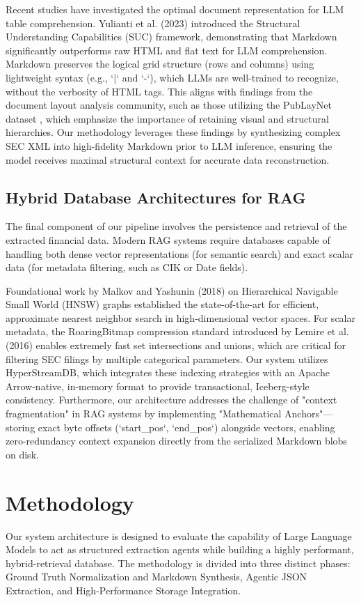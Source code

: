 \documentclass[journal, onecolumn]{IEEEtran}
\begin{document}
Recent studies have investigated the optimal document representation for LLM table comprehension. Yulianti et al. (2023) \cite{yulianti2023structural} introduced the Structural Understanding Capabilities (SUC) framework, demonstrating that Markdown significantly outperforms raw HTML and flat text for LLM comprehension. Markdown preserves the logical grid structure (rows and columns) using lightweight syntax (e.g., `|` and `-`), which LLMs are well-trained to recognize, without the verbosity of HTML tags. This aligns with findings from the document layout analysis community, such as those utilizing the PubLayNet dataset \cite{zhong2020publaynet}, which emphasize the importance of retaining visual and structural hierarchies. Our methodology leverages these findings by synthesizing complex SEC XML into high-fidelity Markdown prior to LLM inference, ensuring the model receives maximal structural context for accurate data reconstruction.

\subsection{Hybrid Database Architectures for RAG}
The final component of our pipeline involves the persistence and retrieval of the extracted financial data. Modern RAG systems require databases capable of handling both dense vector representations (for semantic search) and exact scalar data (for metadata filtering, such as CIK or Date fields). 

Foundational work by Malkov and Yashunin (2018) \cite{malkov2018hnsw} on Hierarchical Navigable Small World (HNSW) graphs established the state-of-the-art for efficient, approximate nearest neighbor search in high-dimensional vector spaces. For scalar metadata, the RoaringBitmap compression standard introduced by Lemire et al. (2016) \cite{lemire2016roaring} enables extremely fast set intersections and unions, which are critical for filtering SEC filings by multiple categorical parameters. Our system utilizes HyperStreamDB, which integrates these indexing strategies with an Apache Arrow-native, in-memory format to provide transactional, Iceberg-style consistency. Furthermore, our architecture addresses the challenge of "context fragmentation" in RAG systems \cite{kamalloo2023evaluating} by implementing "Mathematical Anchors"—storing exact byte offsets (`start\_pos`, `end\_pos`) alongside vectors, enabling zero-redundancy context expansion directly from the serialized Markdown blobs on disk.

\section{Methodology}
Our system architecture is designed to evaluate the capability of Large Language Models to act as structured extraction agents while building a highly performant, hybrid-retrieval database. The methodology is divided into three distinct phases: Ground Truth Normalization and Markdown Synthesis, Agentic JSON Extraction, and High-Performance Storage Integration.
\end{document}
